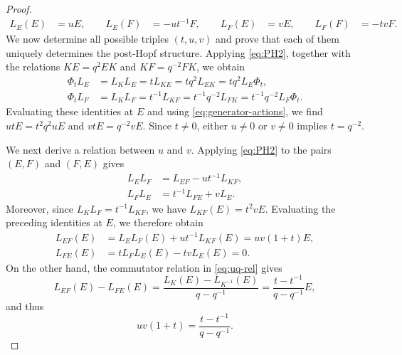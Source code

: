 \documentclass[11pt,english]{article}
\theoremstyle{definition}
\begin{document}
\begin{proof}
\begin{equation}
\begin{aligned}
L_E(E)&=uE, \qquad
L_E(F)&=-ut^{-1}F, \qquad
L_F(E)&=vE, \qquad
L_F(F)&=-tvF.
\end{aligned}
\end{equation}
We now determine all possible triples
$(t,u,v)$ and prove that each of them uniquely
determines the post-Hopf structure.  Applying \eqref{eq:PH2}, together with
the relations $KE=q^2EK$ and $KF=q^{-2}FK$,
we obtain
\[
\begin{aligned}
\Phi_tL_E
&=L_KL_E=tL_{KE}
=tq^2L_{EK}=tq^2L_E\Phi_t,\\
\Phi_tL_F
&=L_KL_F=t^{-1}L_{KF}
=t^{-1}q^{-2}L_{FK}
=t^{-1}q^{-2}L_F\Phi_t.
\end{aligned}
\]
Evaluating these identities at $E$ and using
\eqref{eq:generator-actions}, we find $utE=t^2q^2uE$ and $vtE=q^{-2}vE$.
Since $t\ne0$, either $u\ne0$ or $v\ne0$
implies $t=q^{-2}$.

We next derive a relation between $u$ and $v$.
Applying \eqref{eq:PH2} to the pairs $(E,F)$
and $(F,E)$ gives
\[
\begin{aligned}
L_EL_F&=L_{EF}-ut^{-1}L_{KF},\\
L_FL_E&=t^{-1}L_{FE}+vL_E.
\end{aligned}
\]
Moreover, since $L_KL_F=t^{-1}L_{KF}$,
we have $L_{KF}(E)=t^2vE$.
Evaluating the preceding identities at $E$,
we therefore obtain
\[
\begin{aligned}
L_{EF}(E)
&=L_EL_F(E)+ut^{-1}L_{KF}(E)
=uv(1+t)E,\\
L_{FE}(E)
&=tL_FL_E(E)-tvL_E(E)=0.
\end{aligned}
\]
On the other hand, the commutator relation
in \eqref{eq:uq-rel} gives
\[
L_{EF}(E)-L_{FE}(E)
=\frac{L_K(E)-L_{K^{-1}}(E)}{q-q^{-1}}
=\frac{t-t^{-1}}{q-q^{-1}}E,
\]
and thus
\begin{equation}\label{eq:uv-condition}
uv(1+t)=\frac{t-t^{-1}}{q-q^{-1}}.
\end{equation}


\end{proof}
\end{document}
